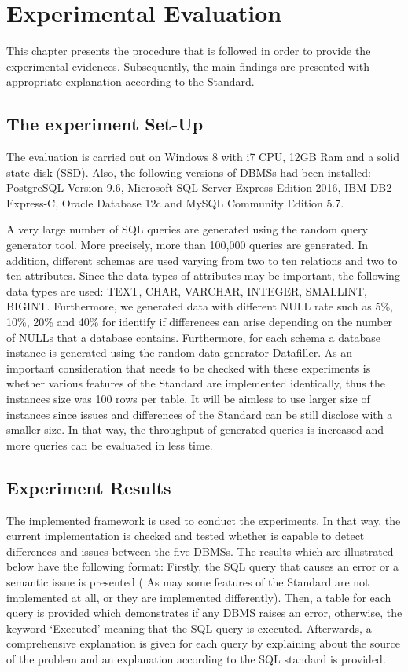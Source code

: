 \chapter{Experimental Evaluation}
This chapter presents the procedure that is followed in order to provide the experimental evidences. Subsequently, the main findings are presented with appropriate explanation according to the Standard. 

\section{The experiment Set-Up}
The evaluation is carried out on Windows 8 with i7 CPU, 12GB Ram and a solid state disk (SSD). Also, the following versions of DBMSs had been installed: PostgreSQL Version 9.6, Microsoft SQL Server Express Edition 2016, IBM DB2 Express-C, Oracle Database 12c and MySQL Community Edition 5.7. 

A very large number of SQL queries are generated using the random query generator tool. More precisely, more than 100,000 queries are generated. In addition, different schemas are used varying from two to ten relations and two to ten attributes. Since the data types of attributes may be important, the following data types are used: TEXT, CHAR, VARCHAR, INTEGER, SMALLINT, BIGINT. Furthermore,  we generated data with different NULL rate such as 5\%, 10\%, 20\% and 40\% for identify if differences can arise depending on the number of NULLs that a database contains.  Furthermore, for each schema a database instance is generated using the random data generator Datafiller. As an important consideration that needs to be checked with these experiments is whether various features of the Standard are implemented identically, thus the instances size was 100 rows per table. It will be aimless to use larger size of instances since issues and differences of the Standard can be still disclose with a smaller size. In that way, the throughput of generated queries is increased and more queries can be evaluated in less time. 


\section{Experiment Results}
The implemented framework is used to conduct the experiments. In that way, the current implementation is checked and tested whether is capable to detect differences and issues between the five DBMSs. The results which are illustrated below have the following format: Firstly,  the SQL query that causes an error or a semantic issue is presented ( As may some features of the Standard are not implemented at all, or they are implemented differently). Then, a table for each query is provided which demonstrates if any DBMS raises an error,  otherwise, the keyword ‘Executed’ meaning that the SQL query is executed. Afterwards, a comprehensive explanation is given for each query by explaining about the source of the problem and an explanation according to the SQL standard is provided.   

